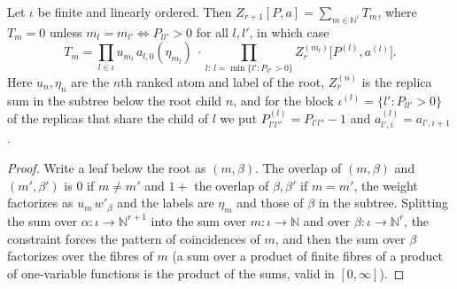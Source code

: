 \begin{theorem}\label{thm:sg:replica-peeling}
  \leanok
Let $\iota$ be finite and linearly ordered. Then $Z_{r+1}[P,a]=\sum_{m\in\mathbb N^\iota}T_m$, where $T_m=0$ unless
$m_l=m_{l'}\Leftrightarrow P_{ll'}>0$ for all $l,l'$, in which case
\[
 T_m=\prod_{l\in\iota}u_{m_l}\,a_{l,0}(\eta_{m_l})\ \cdot\prod_{l:\ l=\min\{l':P_{ll'}>0\}}Z_r^{(m_l)}\big[P^{(l)},a^{(l)}\big].
\]
Here $u_n,\eta_n$ are the $n$th ranked atom and label of the root, $Z_r^{(n)}$ is the replica sum in the subtree below the root child $n$,
and for the block $\iota^{(l)}=\{l':P_{ll'}>0\}$ of the replicas that share the child of $l$ we put $P^{(l)}_{l'l''}=P_{l'l''}-1$ and
$a^{(l)}_{l',i}=a_{l',i+1}$.
\end{theorem}
\begin{proof}
  \leanok
Write a leaf below the root as $(m,\beta)$. The overlap of $(m,\beta)$ and $(m',\beta')$ is $0$ if $m\ne m'$ and $1+$ the overlap of
$\beta,\beta'$ if $m=m'$, the weight factorizes as $u_m\,w'_\beta$ and the labels are $\eta_m$ and those of $\beta$ in the subtree.
Splitting the sum over $\alpha:\iota\to\mathbb N^{r+1}$ into the sum over $m:\iota\to\mathbb N$ and over $\beta:\iota\to\mathbb N^r$, the
constraint forces the pattern of coincidences of $m$, and then the sum over $\beta$ factorizes over the fibres of $m$
(a sum over a product of finite fibres of a product of one-variable functions is the product of the sums, valid in $[0,\infty]$).
\end{proof}

